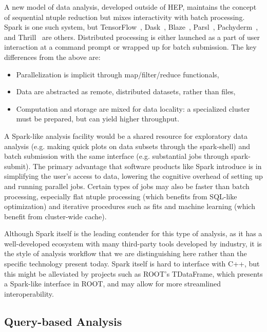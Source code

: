\documentclass[12pt,a4paper]{article}
\begin{document}
A new model of data analysis, developed outside of HEP, maintains the concept of sequential ntuple reduction but mixes interactivity with batch processing. Spark is one such system, but TensorFlow~\cite{abadi2016tensorflow}, Dask~\cite{rocklin2015dask}, Blaze~\cite{wiebe2014blaze}, Parsl~\cite{babuji_yadu_2017_853492}, Pachyderm~\cite{thepachydermteam}, and Thrill~\cite{bingmann2016thrill} are others. Distributed processing is either launched as a part of user interaction at a command prompt or wrapped up for batch submission. The key differences from the above are:
\begin{itemize}
\item Parallelization is implicit through map/filter/reduce functionals,
\item Data are abstracted as remote, distributed datasets, rather than files,
\item Computation and storage are mixed for data locality: a specialized cluster must be prepared, but can yield higher throughput.
\end{itemize}

A Spark-like analysis facility would be a shared resource for exploratory data analysis (e.g. making quick plots on data subsets through the spark-shell) and batch submission with the same interface (e.g. substantial jobs through spark-submit). The primary advantage that software products like Spark introduce is in simplifying the user's access to data, lowering the cognitive overhead of setting up and running parallel jobs. Certain types of jobs may also be faster than batch processing, especially flat ntuple processing (which benefits from SQL-like optimization) and iterative procedures such as fits and machine learning (which benefit from cluster-wide cache).

Although Spark itself is the leading contender for this type of analysis, as it has a well-developed ecosystem with many third-party tools developed by industry, it is the style of analysis workflow that we are distinguishing here rather than the specific technology present today. Spark itself is hard to interface with C++, but this might be alleviated by projects such as ROOT's TDataFrame, which presents a Spark-like interface in ROOT, and may allow for more streamlined interoperability.

\subsection{Query-based Analysis}
\end{document}
